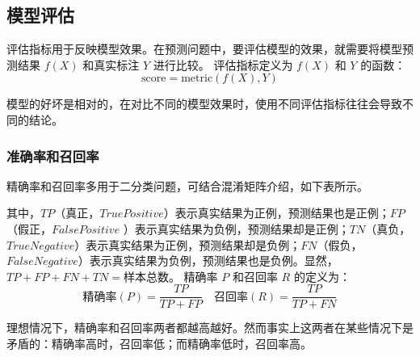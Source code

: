 \documentclass[withoutpreface,bwprint]{cumcmthesis}
\begin{document}

\subsection{模型评估}

评估指标用于反映模型效果。在预测问题中，要评估模型的效果，就需要将模型预测结果 \( f(X) \) 和真实标注 \( Y \) 进行比较。
评估指标定义为 \( f(X) \) 和 \( Y \) 的函数：
\[ \text{score} = \text{metric}(f(X), Y) \]

模型的好坏是相对的，在对比不同的模型效果时，使用不同评估指标往往会导致不同的结论。

\subsubsection{准确率和召回率}

精确率和召回率多用于二分类问题，可结合混淆矩阵介绍，如下表所示。

\begin{table}[htbp]
  \centering
  \caption{预测结果}
  \label{tab:example}
\end{table}

其中，\( TP \)（真正，\(True Positive\)）表示真实结果为正例，预测结果也是正例；\( FP \)（假正，\(False Positive\) ）表示真实结果为负例，预测结果却是正例；\( TN \)（真负，\(True Negative\)）表示真实结果为正例，预测结果却是负例；\( FN \)（假负，\(False Negative\)）表示真实结果为负例，预测结果也是负例。显然，\( TP+FP+FN+TN= \)样本总数。
精确率 \( P \) 和召回率 \( R \) 的定义为：
\[ \text{精确率}(P) = \frac{TP}{TP + FP} \quad \text{召回率}(R) = \frac{TP}{TP + FN} \]

理想情况下，精确率和召回率两者都越高越好。然而事实上这两者在某些情况下是矛盾的：精确率高时，召回率低；而精确率低时，召回率高。
\end{document}

